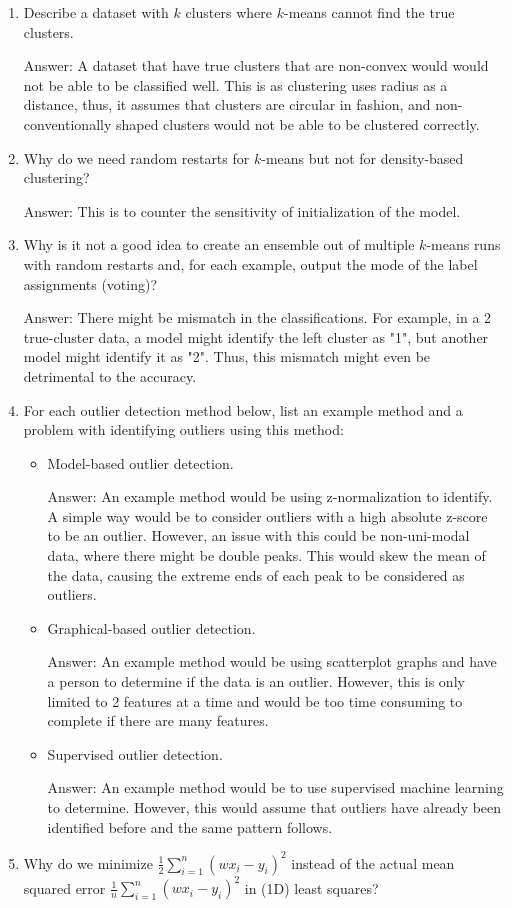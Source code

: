 \documentclass{article}
\def\ans#1{\par\gre{Answer: #1}}
\def\gre#1{{\color{gre}#1}}
\begin{document}
\begin{enumerate}
\item Describe a dataset with $k$ clusters where $k$-means cannot find the true clusters.
\ans{A dataset that have true clusters that are non-convex would would not be able to be classified well. This is as clustering uses radius as a distance, thus, it assumes that clusters are circular in fashion, and non-conventionally shaped clusters would not be able to be clustered correctly.}
\item Why do we need random restarts for $k$-means but not for density-based clustering?
\ans{This is to counter the sensitivity of initialization of the model.}
\item Why is it not a good idea to create an ensemble out of multiple $k$-means runs with random restarts and, for each example, output the mode of the label assignments (voting)?
\ans{There might be mismatch in the classifications. For example, in a 2 true-cluster data, a model might identify the left cluster as "1", but another model might identify it as "2". Thus, this mismatch might even be detrimental to the accuracy.}
\item For each outlier detection method below, list an example method and a problem with identifying outliers using this method:
\begin{itemize}
\item Model-based outlier detection.
\ans{An example method would be using z-normalization to identify. A simple way would be to consider outliers with a high absolute z-score to be an outlier. However, an issue with this could be non-uni-modal data, where there might be double peaks. This would skew the mean of the data, causing the extreme ends of each peak to be considered as outliers.}
\item Graphical-based outlier detection.
\ans{An example method would be using scatterplot graphs and have a person to determine if the data is an outlier. However, this is only limited to 2 features at a time and would be too time consuming to complete if there are many features.}
\item Supervised outlier detection.
\ans{An example method would be to use supervised machine learning to determine. However, this would assume that outliers have already been identified before and the same pattern follows.}
\end{itemize}
\item Why do we minimize $\frac{1}{2}\sum_{i=1} ^n (wx_i-y_i)^2$ instead of the actual mean squared error $\frac{1}{n}\sum_{i=1}^n (wx_i-y_i)^2$ in (1D) least squares?

\end{enumerate}
\end{document}
